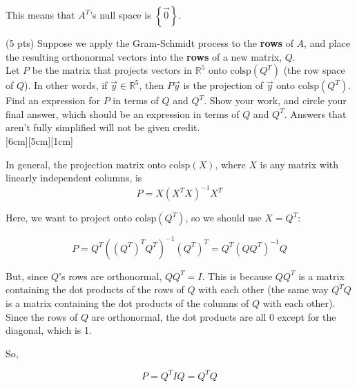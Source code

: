 \documentclass[11pt]{article}
\begin{document}
\begin{prob}[(13 pts)]
\begin{subprob}
\begin{solution}
This means that $A^T$'s null space is $\left\{ \vec 0 \right\}$.
\end{solution}
\end{subprob}

\begin{subprob} (5 pts) Suppose we apply the Gram-Schmidt process to the \textbf{rows} of $A$, and place the resulting orthonormal vectors into the \textbf{rows} of a new matrix, $Q$.\\

Let $P$ be the matrix that projects vectors in $\mathbb{R}^5$ onto $\text{colsp}(Q^T)$ (the row space of $Q$). In other words, if $\vec y \in \mathbb{R}^5$, then $P\vec y$ is the projection of $\vec y$ onto $\text{colsp}(Q^T)$.\\

Find an expression for $P$ in terms of $Q$ and $Q^T$. Show your work, and $\boxed{\text{circle}}$ your final answer, which should be an expression in terms of $Q$ and $Q^T$. Answers that aren't fully simplified will not be given credit. \\

[6cm][5cm][1cm]
\begin{solution}
In general, the projection matrix onto $\text{colsp}(X)$, where $X$ is any matrix with linearly independent columns, is $$P = X(X^TX)^{-1}X^T$$

Here, we want to project onto $\text{colsp}(Q^T)$, so we should use $X = Q^T$:

$$P = Q^T((Q^T)^TQ^T)^{-1}(Q^T)^T = Q^T(QQ^T)^{-1}Q$$

But, since $Q$'s rows are orthonormal, $QQ^T = I$. This is because $QQ^T$ is a matrix containing the dot products of the rows of $Q$ with each other (the same way $Q^TQ$ is a matrix containing the dot products of the columns of $Q$ with each other). Since the rows of $Q$ are orthonormal, the dot products are all 0 except for the diagonal, which is 1.

So, 

$$P = Q^T I Q = Q^T Q$$
\end{solution}
\end{subprob}

\end{prob}

\newpage
\end{document}
